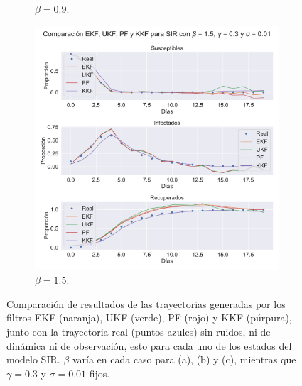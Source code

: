 \begin{figure}[h!]
\begin{subfigure}[b]{0.49\textwidth}
    \caption{$\beta = 0.9$.}
    \label{fig:nonlinear_filters_sir_beta_09}
    \end{subfigure}
    \begin{subfigure}[b]{0.49\textwidth}
        \includegraphics[width=\linewidth]{img/content/chapter4/nonlinear_filters_sir_beta_15.pdf}
    \caption{$\beta = 1.5$.}
    \label{fig:nonlinear_filters_sir_beta_15}
    \end{subfigure}
    \caption{Comparación de resultados de las trayectorias generadas por los filtros EKF (naranja), UKF (verde), PF (rojo) y KKF (púrpura), junto con la trayectoria real (puntos azules) sin ruidos, ni de dinámica ni de observación, esto para cada uno de los estados del modelo SIR. $\beta$ varía en cada caso para (a), (b) y (c), mientras que $\gamma = 0.3$ y $\sigma = 0.01$ fijos.}
\end{figure}

